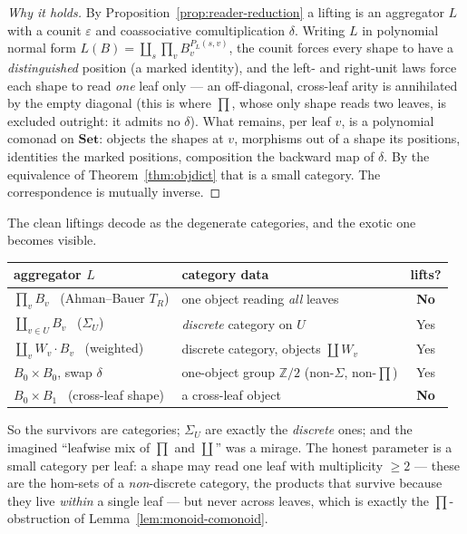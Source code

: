 \documentclass[11pt,a4paper]{book}
\newcommand{\Set}{\mathbf{Set}}
\theoremstyle{plain}
\theoremstyle{definition}
\theoremstyle{remark}
\begin{document}
\begin{proof}[Why it holds]
By Proposition~\ref{prop:reader-reduction} a lifting is an aggregator $L$ with a counit $\varepsilon$
and coassociative comultiplication $\delta$. Writing $L$ in polynomial normal form
$L(B)=\coprod_{s}\prod_{v}B_{v}^{P_{L}(s,v)}$, the counit forces every shape to have a
\emph{distinguished} position (a marked identity), and the left- and right-unit laws force each shape
to read \emph{one} leaf only --- an off-diagonal, cross-leaf arity is annihilated by the empty
diagonal (this is where $\prod$, whose only shape reads two leaves, is excluded outright: it admits no
$\delta$). What remains, per leaf $v$, is a polynomial comonad on $\Set$: objects the shapes at $v$,
morphisms out of a shape its positions, identities the marked positions, composition the backward map
of $\delta$. By the equivalence of Theorem~\ref{thm:objdict} that is a small category. The
correspondence is mutually inverse.
\end{proof}

The clean liftings decode as the degenerate categories, and the exotic one becomes visible.

\begin{center}
\renewcommand{\arraystretch}{1.35}
\begin{tabular}{@{}l l c@{}}
 aggregator $L$ & category data & lifts?\\\hline
 $\prod_{v}B_{v}$ \ (Ahman--Bauer $T_{R}$) & one object reading \emph{all} leaves & \textbf{No}\\
 $\coprod_{v\in U}B_{v}$ \ ($\Sigma_{U}$) & \emph{discrete} category on $U$ & Yes\\
 $\coprod_{v}W_{v}\cdot B_{v}$ \ (weighted) & discrete category, objects $\textstyle\coprod W_{v}$ & Yes\\
 $B_{0}\times B_{0}$, swap $\delta$ & one-object group $\mathbb Z/2$ (non-$\Sigma$, non-$\prod$) & Yes\\
 $B_{0}\times B_{1}$ \ (cross-leaf shape) & a cross-leaf object & \textbf{No}
\end{tabular}
\end{center}

\noindent So the survivors are categories; $\Sigma_{U}$ are exactly the \emph{discrete} ones; and the
imagined ``leafwise mix of $\prod$ and $\coprod$'' was a mirage. The honest parameter is a small
category per leaf: a shape may read one leaf with multiplicity $\ge 2$ --- these are the hom-sets of a
\emph{non}-discrete category, the products that survive because they live \emph{within} a single leaf
--- but never across leaves, which is exactly the $\prod$-obstruction of
Lemma~\ref{lem:monoid-comonoid}.
\end{document}
